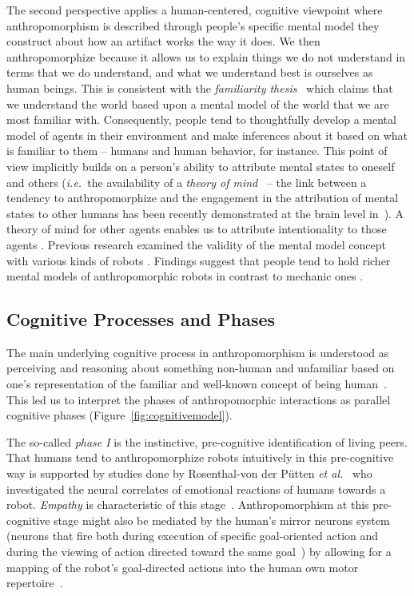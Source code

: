 \documentclass{frontiersSCNS} %
\newcommand{\ie}{{\textit{i.e.~}}}
\begin{document}
The second perspective applies a human-centered, cognitive viewpoint where
anthropomorphism is described through people's specific mental model they
construct about how an artifact works the way it does.  We then
anthropomorphize because it allows us to explain things we do not understand in
terms that we do understand, and what we understand best is ourselves as human
beings. This is consistent with the \emph{familiarity
thesis}~\cite{hegel_understanding_2008} which claims that we understand the
world based upon a mental model of the world that we are most familiar with.
Consequently, people tend to thoughtfully develop a mental model of agents in
their environment and make inferences about it based on what is familiar to
them -- humans and human behavior, for instance.  This point of view implicitly
builds on a person's ability to attribute mental states to oneself and others
(\ie the availability of a \emph{theory of mind}~\cite{premack1978does} -- the
link between a tendency to anthropomorphize and the engagement in the
attribution of mental states to other humans has been recently demonstrated at
the brain level in~\cite{cullen2013individual}). A theory of mind for other
agents enables us to attribute intentionality to those agents
\cite{leslie_pretense_1987,admoni_multi-category_2012}. Previous research
examined the validity of the mental model concept with various kinds of robots
\cite{schmitz_concepts_2011,kiesler_mental_2002}. Findings suggest that people
tend to hold richer mental models of anthropomorphic robots in contrast to
mechanic ones \cite{kiesler_mental_2002}.

\subsection{Cognitive Processes and Phases}

The main underlying cognitive process in anthropomorphism is understood as
perceiving and reasoning about something non-human and unfamiliar based on one's
representation of the familiar and well-known concept of being
human~\cite{epley_when_2008}. This led us to interpret the phases of
anthropomorphic interactions as parallel cognitive phases
(Figure~\ref{fig:cognitivemodel}).

The so-called \emph{phase I} is the instinctive, pre-cognitive identification of
living peers. That humans tend to anthropomorphize robots intuitively in this
pre-cognitive way
is supported by studies done by Rosenthal-von der Pütten
\textit{et al.}~\cite{rosenthal-vonderputten_experimental_2013} who investigated
the neural correlates of emotional reactions of humans towards a robot. {\it
Empathy} is characteristic of this stage~\cite{rosenthalvonderPutten2013neural}.
Anthropomorphism at this pre-cognitive stage might also be mediated by the
human's mirror neurons system (neurons that fire both during execution of
specific goal-oriented action and during the viewing of action directed toward
the same goal~\cite{Rizzolatti1996, Kilner2009}) by allowing for a mapping of
the robot's goal-directed actions into the human own motor
repertoire~\cite{Gallese1998, Wolpert2003, cullen2013individual}.
\end{document}
